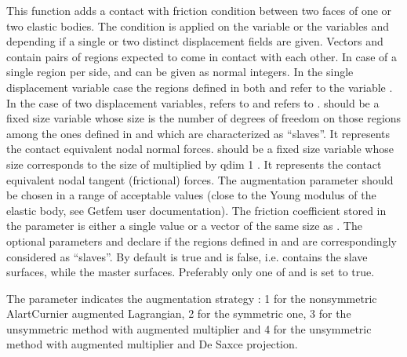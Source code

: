 \documentclass[a4paper,11pt,english]{sphinxmanual}
\begin{document}
This function adds a contact with friction condition between two faces of
one or two elastic bodies. The condition is applied on the variable
 or the variables  and  depending if a
single or two distinct displacement fields are given. Vectors  and 
contain pairs of regions expected to come in contact with each other. In
case of a single region per side,  and  can be given as normal
integers. In the single displacement variable case the regions defined in
both  and  refer to the variable . In the case of
two displacement variables,  refers to  and  refers
to .  should be a fixed size variable whose size
is the number of degrees of freedom on those regions among the ones
defined in  and  which are characterized as “slaves”. It
represents the contact equivalent nodal normal forces. 
should be a fixed size variable whose size corresponds to the size of
 multiplied by qdim \sphinxhyphen{} 1 . It represents the contact
equivalent nodal tangent (frictional) forces. The augmentation parameter
 should be chosen in a range of acceptable values (close to the Young
modulus of the elastic body, see Getfem user documentation). The friction
coefficient stored in the parameter  is either a single
value or a vector of the same size as . The optional
parameters  and  declare if the regions defined in 
and  are correspondingly considered as “slaves”. By default 
is true and  is false, i.e.  contains the slave surfaces,
while  the master surfaces. Preferably only one of  and
 is set to true.

The parameter  indicates the augmentation strategy :
1 for the non\sphinxhyphen{}symmetric Alart\sphinxhyphen{}Curnier augmented Lagrangian,
2 for the symmetric one,
3 for the unsymmetric method with augmented multiplier and
4 for the unsymmetric method with augmented multiplier and De Saxce projection.
\end{document}
